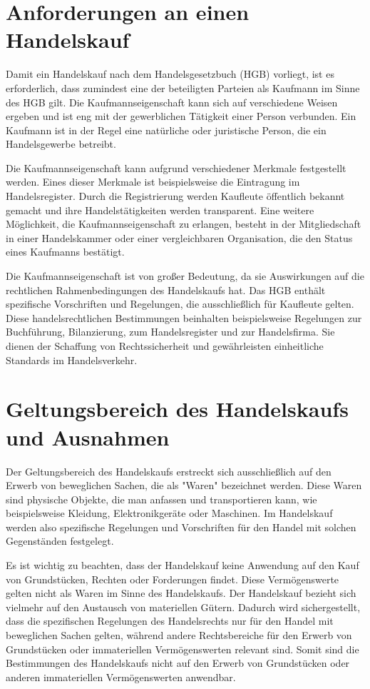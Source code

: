 \section{Anforderungen an einen Handelskauf}
Damit ein Handelskauf nach dem Handelsgesetzbuch (HGB) vorliegt, ist es erforderlich, dass zumindest eine der beteiligten Parteien als Kaufmann im Sinne des HGB gilt. Die Kaufmannseigenschaft kann sich auf verschiedene Weisen ergeben und ist eng mit der gewerblichen Tätigkeit einer Person verbunden. Ein Kaufmann ist in der Regel eine natürliche oder juristische Person, die ein Handelsgewerbe betreibt.

Die Kaufmannseigenschaft kann aufgrund verschiedener Merkmale festgestellt werden. Eines dieser Merkmale ist beispielsweise die Eintragung im Handelsregister. Durch die Registrierung werden Kaufleute öffentlich bekannt gemacht und ihre Handelstätigkeiten werden transparent. Eine weitere Möglichkeit, die Kaufmannseigenschaft zu erlangen, besteht in der Mitgliedschaft in einer Handelskammer oder einer vergleichbaren Organisation, die den Status eines Kaufmanns bestätigt.

Die Kaufmannseigenschaft ist von großer Bedeutung, da sie Auswirkungen auf die rechtlichen Rahmenbedingungen des Handelskaufs hat. Das HGB enthält spezifische Vorschriften und Regelungen, die ausschließlich für Kaufleute gelten. Diese handelsrechtlichen Bestimmungen beinhalten beispielsweise Regelungen zur Buchführung, Bilanzierung, zum Handelsregister und zur Handelsfirma. Sie dienen der Schaffung von Rechtssicherheit und gewährleisten einheitliche Standards im Handelsverkehr.
\newpage\section{Geltungsbereich des Handelskaufs und Ausnahmen}
Der Geltungsbereich des Handelskaufs erstreckt sich ausschließlich auf den Erwerb von beweglichen Sachen, die als "Waren" bezeichnet werden. Diese Waren sind physische Objekte, die man anfassen und transportieren kann, wie beispielsweise Kleidung, Elektronikgeräte oder Maschinen. Im Handelskauf werden also spezifische Regelungen und Vorschriften für den Handel mit solchen Gegenständen festgelegt.

Es ist wichtig zu beachten, dass der Handelskauf keine Anwendung auf den Kauf von Grundstücken, Rechten oder Forderungen findet. Diese Vermögenswerte gelten nicht als Waren im Sinne des Handelskaufs. Der Handelskauf bezieht sich vielmehr auf den Austausch von materiellen Gütern. Dadurch wird sichergestellt, dass die spezifischen Regelungen des Handelsrechts nur für den Handel mit beweglichen Sachen gelten, während andere Rechtsbereiche für den Erwerb von Grundstücken oder immateriellen Vermögenswerten relevant sind. Somit sind die Bestimmungen des Handelskaufs nicht auf den Erwerb von Grundstücken oder anderen immateriellen Vermögenswerten anwendbar.
